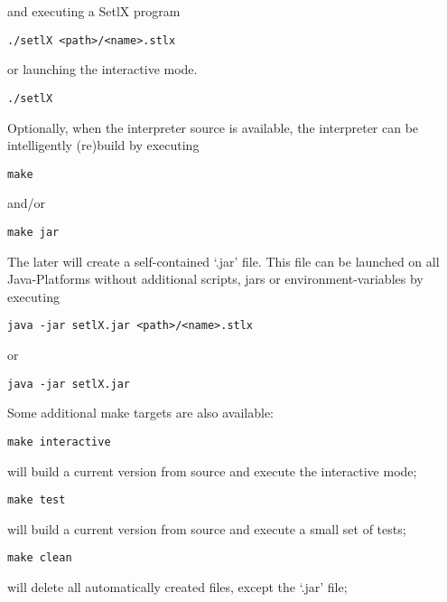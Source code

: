 and executing a SetlX program

\begin{lstlisting}
./setlX <path>/<name>.stlx
\end{lstlisting}

or launching the interactive mode.

\begin{lstlisting}
./setlX
\end{lstlisting}

\vspace{1em}

Optionally, when the interpreter source is available, the interpreter can be intelligently (re)build by executing

\begin{lstlisting}
make
\end{lstlisting}

and/or

\begin{lstlisting}
make jar
\end{lstlisting}

The later will create a self-contained `.jar' file. This file can be launched on all Java-Platforms without additional scripts, jars or environment-variables by executing

\begin{lstlisting}
java -jar setlX.jar <path>/<name>.stlx
\end{lstlisting}

or

\begin{lstlisting}
java -jar setlX.jar
\end{lstlisting}

Some additional make targets are also available:

\begin{lstlisting}
make interactive
\end{lstlisting}

will build a current version from source and execute the interactive mode;

\begin{lstlisting}
make test
\end{lstlisting}

will build a current version from source and execute a small set of tests;

\begin{lstlisting}
make clean
\end{lstlisting}

will delete all automatically created files, except the `.jar' file;

